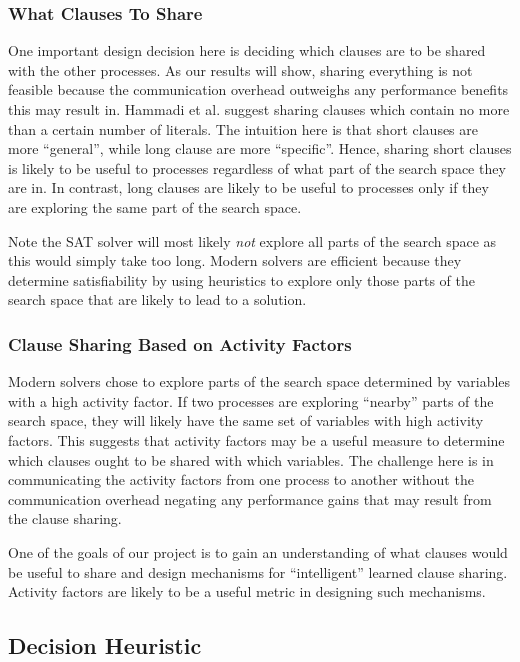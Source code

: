 \documentclass[letterpaper, compsoc, conference]{IEEEtran}
\begin{document}
\subsubsection{What Clauses To Share}

One important design decision here is deciding which clauses are to be shared
with the other processes. As our results will show, sharing everything is not
feasible because the communication overhead outweighs any performance benefits
this may result in. Hammadi et al. \cite{Hammadi} suggest sharing clauses which
contain no more than a certain number of literals. The intuition here is that
short clauses are more ``general'', while long clause are more ``specific''.
Hence, sharing short clauses is likely to be useful to processes regardless of
what part of the search space they are in. In contrast, long clauses are likely
to be useful to processes only if they are exploring the same part of the
search space. 

Note the SAT solver will most likely \textit{not} explore all parts of the
search space as this would simply take too long. Modern solvers are efficient
because they determine satisfiability by using heuristics to explore only
those parts of the search space that are likely to lead to a solution.

\subsubsection{Clause Sharing Based on Activity Factors}

Modern solvers chose to explore parts of the search space determined by
variables with a high activity factor.  If two processes are exploring
``nearby'' parts of the search space, they will likely have the same set of
variables with high activity factors. This suggests that activity factors may
be a useful measure to determine which clauses ought to be shared with which
variables. The challenge here is in communicating the activity factors from one
process to another without the communication overhead negating any performance
gains that may result from the clause sharing.

One of the goals of our project is to gain an understanding of what clauses
would be useful to share and design mechanisms for ``intelligent'' learned
clause sharing.  Activity factors are likely to be a useful metric in designing
such mechanisms.

\subsection{Decision Heuristic} 
\end{document}
